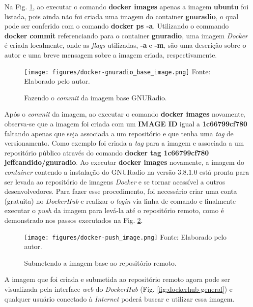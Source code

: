 \documentclass[
  12pt,				%
  openright,			%
  twoside,			%
  a4paper,			%
  english,			%
  french,				%
  spanish,			%
  brazil,				%
  ]{abntex2}
\begin{document}
Na Fig. \ref{fig:docker-gnuradio_base_image}, ao executar o comando \textbf{docker images} apenas a imagem \textbf{ubuntu}
foi listada, pois ainda não foi criada uma imagem do container \textbf{gnuradio}, o qual pode ser conferido com o comando
\textbf{docker ps -a}. Utilizando o commando \textbf{docker commit} referenciando para o container \textbf{gnuradio}, uma imagem
\textit{Docker} é criada localmente, onde as \textit{flags} utilizadas, \textbf{-a} e \textbf{-m}, são uma descrição
sobre o autor e uma breve mensagem sobre a imagem criada, respectivamente.

\begin{figure}[!htb]
  \centering
  \caption{Fazendo o \textit{commit} da imagem base GNURadio.}
  \texttt{[image: figures/docker-gnuradio\_base\_image.png]}
  Fonte: Elaborado pelo autor.
  \label{fig:docker-gnuradio_base_image}
\end{figure}

Após o \textit{commit} da imagem, ao executar o comando \textbf{docker images} novamente, observa-se que a imagem foi criada com
um \textbf{IMAGE ID} igual a \textbf{1c66799cf780} faltando apenas que seja associada a um repositório e que tenha uma \textit{tag} de versionamento.
Como exemplo foi criada a \textit{tag} para a imagem e associada a um repositório público através do comando \textbf{docker tag 1c66799cf780 jeffcandido/gnuradio}.
Ao executar \textbf{docker images} novamente, a imagem do \textit{container} contendo a instalação do GNURadio na versão 3.8.1.0
está pronta para ser levada ao repositório de imagens \textit{Docker} e se tornar acessível a outros desenvolvedores. Para
fazer esse procedimento, foi necessário criar uma conta (gratuita) no \textit{DockerHub} e realizar o \textit{login} via linha de comando e finalmente
executar o \textit{push} da imagem para levá-la até o repositório remoto, como é demonstrado nos passos executados na Fig. \ref{fig:docker-push_image}.

\begin{figure}[!htb]
  \centering
  \caption{Submetendo a imagem base ao repositório remoto.}
  \texttt{[image: figures/docker-push\_image.png]}
  Fonte: Elaborado pelo autor.
  \label{fig:docker-push_image}
\end{figure}

A imagem que foi criada e submetida ao repositório remoto agora pode ser visualizada pela interface \textit{web} do \textit{DockerHub} (Fig. \ref{fig:dockerhub-general}) e qualquer usuário
conectado à \textit{Internet} poderá buscar e utilizar essa imagem.
\end{document}
